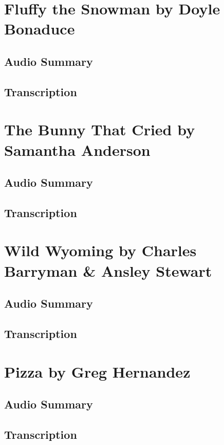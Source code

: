 \section{Fluffy the Snowman by Doyle Bonaduce}

\subsection{Audio Summary}

\subsection{Transcription}

\section{The Bunny That Cried by Samantha Anderson}

\subsection{Audio Summary}

\subsection{Transcription}

\section{Wild Wyoming by Charles Barryman \& Ansley Stewart}

\subsection{Audio Summary}

\subsection{Transcription}

\section{Pizza by Greg Hernandez}

\subsection{Audio Summary}

\subsection{Transcription}

